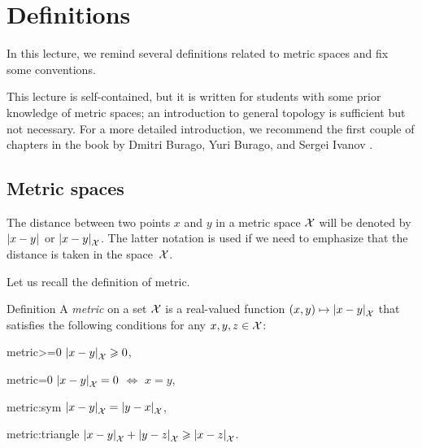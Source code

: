 \chapter{Definitions}\label{chap:defs}

In this lecture, we remind several definitions related to metric spaces and fix some conventions.

This lecture is self-contained, but it is written for students with some prior knowledge of metric spaces;
an introduction to general topology is sufficient but not necessary.
For a more detailed introduction, we recommend the first couple of chapters in the book by Dmitri Burago, Yuri Burago, and Sergei Ivanov \cite{burago-burago-ivanov}.

\section{Metric spaces}
\label{sec:metric spaces}

The distance between two points $x$ and $y$ in a metric space $\mathcal{X}$ will be denoted by $\dist{x}{y}{}$ or $\dist{x}{y}{\spc{X}}$.
The latter notation is used if we need to emphasize 
that the distance is taken in the space~${\mathcal{X}}$.

Let us recall the definition of metric. 

\begin{thm}{Definition}\label{def:metric}
A \emph{metric} on a set $\mathcal{X}$ is a real-valued function $(x,y)\z\mapsto\dist{x}{y}{\spc{X}}$ that satisfies the following conditions for any $x,y,z\z\in \spc{X}$:

\begin{subthm}{metric>=0}
$\dist{x}{y}{\spc{X}}\ge 0$,
\end{subthm}

\begin{subthm}{metric=0} $\dist{x}{y}{\spc{X}}= 0$ $\iff$ $x=y$,
\end{subthm}

\begin{subthm}{metric:sym} $\dist{x}{y}{\spc{X}}=\dist{y}{x}{\spc{X}}$,
\end{subthm}

\begin{subthm}{metric:triangle} $\dist{x}{y}{\spc{X}}+\dist{y}{z}{\spc{X}}\ge\dist{x}{z}{\spc{X}}$.
\end{subthm}

\end{thm}

